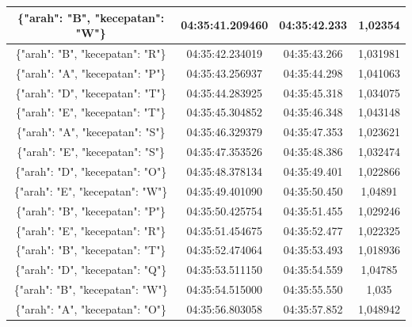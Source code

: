 \begin{table}[htpb]
\begin{tabular}{|ccc|c|}
  \multicolumn{1}{|c|}{\{"arah": "B", "kecepatan": "W"\}} & \multicolumn{1}{c|}{04:35:41.209460} & 04:35:42.233       & 1,02354     \\ \hline
  \multicolumn{1}{|c|}{\{"arah": "B", "kecepatan": "R"\}} & \multicolumn{1}{c|}{04:35:42.234019} & 04:35:43.266       & 1,031981    \\ \hline
  \multicolumn{1}{|c|}{\{"arah": "A", "kecepatan": "P"\}} & \multicolumn{1}{c|}{04:35:43.256937} & 04:35:44.298       & 1,041063    \\ \hline
  \multicolumn{1}{|c|}{\{"arah": "D", "kecepatan": "T"\}} & \multicolumn{1}{c|}{04:35:44.283925} & 04:35:45.318       & 1,034075    \\ \hline
  \multicolumn{1}{|c|}{\{"arah": "E", "kecepatan": "T"\}} & \multicolumn{1}{c|}{04:35:45.304852} & 04:35:46.348       & 1,043148    \\ \hline
  \multicolumn{1}{|c|}{\{"arah": "A", "kecepatan": "S"\}} & \multicolumn{1}{c|}{04:35:46.329379} & 04:35:47.353       & 1,023621    \\ \hline
  \multicolumn{1}{|c|}{\{"arah": "E", "kecepatan": "S"\}} & \multicolumn{1}{c|}{04:35:47.353526} & 04:35:48.386       & 1,032474    \\ \hline
  \multicolumn{1}{|c|}{\{"arah": "D", "kecepatan": "O"\}} & \multicolumn{1}{c|}{04:35:48.378134} & 04:35:49.401       & 1,022866    \\ \hline
  \multicolumn{1}{|c|}{\{"arah": "E", "kecepatan": "W"\}} & \multicolumn{1}{c|}{04:35:49.401090} & 04:35:50.450       & 1,04891     \\ \hline
  \multicolumn{1}{|c|}{\{"arah": "B", "kecepatan": "P"\}} & \multicolumn{1}{c|}{04:35:50.425754} & 04:35:51.455       & 1,029246    \\ \hline
  \multicolumn{1}{|c|}{\{"arah": "E", "kecepatan": "R"\}} & \multicolumn{1}{c|}{04:35:51.454675} & 04:35:52.477       & 1,022325    \\ \hline
  \multicolumn{1}{|c|}{\{"arah": "B", "kecepatan": "T"\}} & \multicolumn{1}{c|}{04:35:52.474064} & 04:35:53.493       & 1,018936    \\ \hline
  \multicolumn{1}{|c|}{\{"arah": "D", "kecepatan": "Q"\}} & \multicolumn{1}{c|}{04:35:53.511150} & 04:35:54.559       & 1,04785     \\ \hline
  \multicolumn{1}{|c|}{\{"arah": "B", "kecepatan": "W"\}} & \multicolumn{1}{c|}{04:35:54.515000} & 04:35:55.550       & 1,035       \\ \hline
  \multicolumn{1}{|c|}{\{"arah": "A", "kecepatan": "O"\}} & \multicolumn{1}{c|}{04:35:56.803058} & 04:35:57.852       & 1,048942    \\ \hline

\end{tabular}
\end{table}
